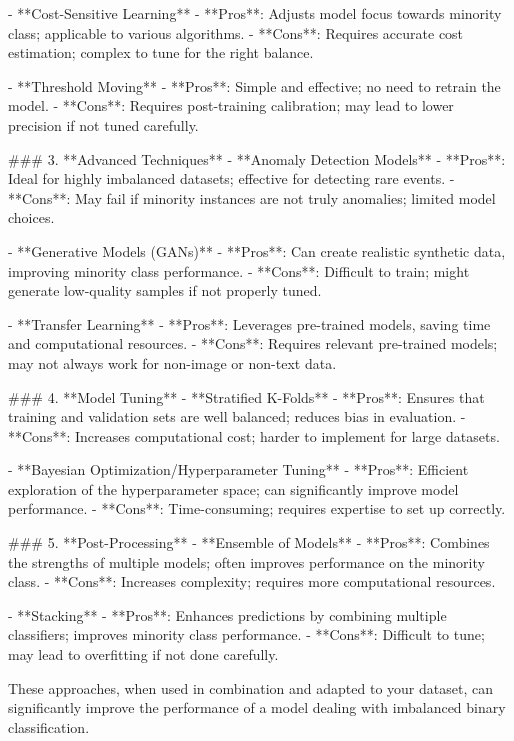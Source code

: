    - **Cost-Sensitive Learning**
     - **Pros**: Adjusts model focus towards minority class; applicable to various algorithms.
     - **Cons**: Requires accurate cost estimation; complex to tune for the right balance.

   - **Threshold Moving**
     - **Pros**: Simple and effective; no need to retrain the model.
     - **Cons**: Requires post-training calibration; may lead to lower precision if not tuned carefully.

### 3. **Advanced Techniques**
   - **Anomaly Detection Models**
     - **Pros**: Ideal for highly imbalanced datasets; effective for detecting rare events.
     - **Cons**: May fail if minority instances are not truly anomalies; limited model choices.

   - **Generative Models (GANs)**
     - **Pros**: Can create realistic synthetic data, improving minority class performance.
     - **Cons**: Difficult to train; might generate low-quality samples if not properly tuned.

   - **Transfer Learning**
     - **Pros**: Leverages pre-trained models, saving time and computational resources.
     - **Cons**: Requires relevant pre-trained models; may not always work for non-image or non-text data.

### 4. **Model Tuning**
   - **Stratified K-Folds**
     - **Pros**: Ensures that training and validation sets are well balanced; reduces bias in evaluation.
     - **Cons**: Increases computational cost; harder to implement for large datasets.

   - **Bayesian Optimization/Hyperparameter Tuning**
     - **Pros**: Efficient exploration of the hyperparameter space; can significantly improve model performance.
     - **Cons**: Time-consuming; requires expertise to set up correctly.

### 5. **Post-Processing**
   - **Ensemble of Models**
     - **Pros**: Combines the strengths of multiple models; often improves performance on the minority class.
     - **Cons**: Increases complexity; requires more computational resources.

   - **Stacking**
     - **Pros**: Enhances predictions by combining multiple classifiers; improves minority class performance.
     - **Cons**: Difficult to tune; may lead to overfitting if not done carefully.

These approaches, when used in combination and adapted to your dataset, can significantly improve the performance of a model dealing with imbalanced binary classification.
